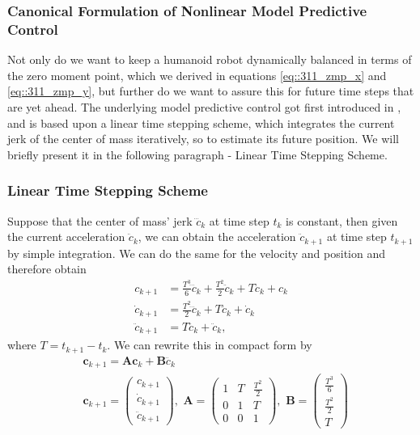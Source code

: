 \subsubsection{Canonical Formulation of Nonlinear Model Predictive Control}
Not only do we want to keep a humanoid robot dynamically balanced in terms of the zero moment point, which we derived in equations \ref{eq::311_zmp_x} and \ref{eq::311_zmp_y}, but further do we want to assure this for future time steps that are yet ahead. The underlying model predictive control got first introduced in \cite{kajita2003biped}, and is based upon a linear time stepping scheme, which integrates the current jerk of the center of mass iteratively, so to estimate its future position. We will briefly present it in the following paragraph - Linear Time Stepping Scheme.
\subsubsection{Linear Time Stepping Scheme}
Suppose that the center of mass' jerk $\dddot{c}_k$ at time step $t_k$ is constant, then given the current acceleration $\ddot{c}_k$, we can obtain the acceleration $\ddot{c}_{k+1}$ at time step $t_{k+1}$ by simple integration. We can do the same for the velocity and position and therefore obtain
\begin{align}
	c_{k+1} &= \frac{T^3}{6}\dddot{c}_k+\frac{T^2}{2}\ddot{c}_k+T\dot{c}_k+c_k\\
	\dot{c}_{k+1} &= \frac{T^2}{2}\dddot{c}_k+T\ddot{c}_k+\dot{c}_k\\
	\ddot{c}_{k+1} &= T\dddot{c}_{k} + \ddot{c}_k,
\end{align}
where $T = t_{k+1}-t_k$. We can rewrite this in compact form by
\begin{align}
	&\bm{c}_{k+1} = \bm{A}\bm{c}_k + \bm{B}\dddot{c}_k \\
	&\bm{c}_{k+1} = \begin{pmatrix}
	c_{k+1} \\
	\dot{c}_{k+1} \\
	\ddot{c}_{k+1}
	\end{pmatrix},\,\,
	\bm{A} = \begin{pmatrix}
	1 & T & \frac{T^2}{2} \\
	0 & 1 & T \\
	0 & 0 & 1
	\end{pmatrix},\,\,
	\bm{B} = \begin{pmatrix}
	\frac{T^3}{6} \\
	\frac{T^2}{2} \\
	T
	\end{pmatrix}
	\label{eq::312_ltss}
\end{align}

